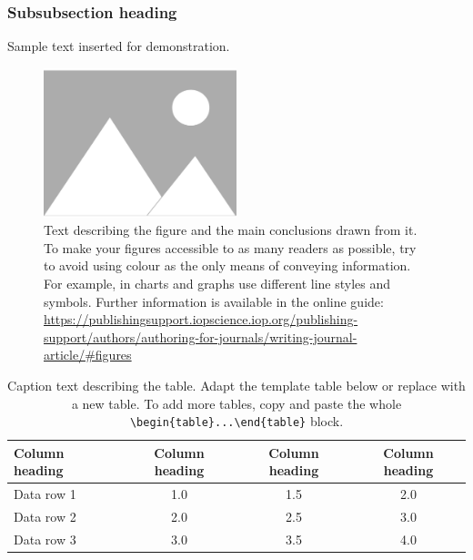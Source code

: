 \documentclass{iopjournal}
\begin{document}
\subsubsection{Subsubsection heading}
Sample text inserted for demonstration.

\begin{figure}
 \centering
        \includegraphics[width=0.5\textwidth]{figure1}
 \caption{Text describing the figure and the main conclusions drawn from it. To make your figures accessible to as many readers as possible, try to avoid using colour as the only means of conveying information. For example, in charts and graphs use different line styles and symbols. Further information is available in the online guide: \href{https://publishingsupport.iopscience.iop.org/publishing-support/authors/authoring-for-journals/writing-journal-article/\#figures}{https://publishingsupport.iopscience.iop.org/publishing-support/authors/authoring-for-journals/writing-journal-article/\#figures}}
\label{fig1}
\end{figure}


\begin{table}
\caption{Caption text describing the table. Adapt the template table below or replace with a new table. To add more tables, copy and paste the whole {\tt \textbackslash begin\{table\}...\textbackslash end\{table\}} block.}
\centering
\begin{tabular}{l c c c}
\hline
Column heading & Column heading & Column heading & Column heading \\
\hline
Data row 1 & 1.0 & 1.5 & 2.0 \\
Data row 2 & 2.0 & 2.5 & 3.0 \\
Data row 3 & 3.0 & 3.5 & 4.0 \\
\hline
\end{tabular}
\label{tab1}
\end{table}

%
%
\end{document}
